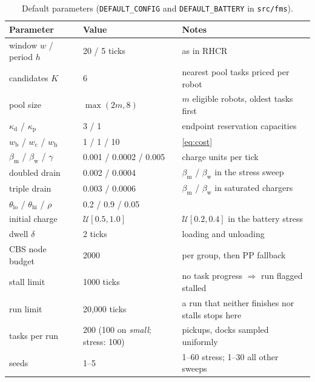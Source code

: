 \begin{table}[h]
\centering
\caption{Default parameters (\texttt{DEFAULT\_CONFIG} and \texttt{DEFAULT\_BATTERY} in \texttt{src/fms}).}
\label{tab:params}
\small
\begin{tabular}{lll}
\toprule
\textbf{Parameter} & \textbf{Value} & \textbf{Notes}\\
\midrule
window $w$ / period $h$ & 20 / 5 ticks & as in RHCR \citep{li2021rhcr}\\
candidates $K$ & 6 & nearest pool tasks priced per robot\\
pool size & $\max(2m,8)$ & $m$ eligible robots, oldest tasks first\\
$\kappa_{\mathrm{d}}$ / $\kappa_{\mathrm{p}}$ & 3 / 1 & endpoint reservation capacities\\
$w_{\mathrm{b}}$ / $w_{\mathrm{c}}$ / $w_{\mathrm{h}}$ & 1 / 1 / 10 & \cref{eq:cost}\\
$\beta_{\mathrm{m}}$ / $\beta_{\mathrm{w}}$ / $\gamma$ & 0.001 / 0.0002 / 0.005 & charge units per tick\\
doubled drain & 0.002 / 0.0004 & $\beta_{\mathrm{m}}$ / $\beta_{\mathrm{w}}$ in the stress sweep\\
triple drain & 0.003 / 0.0006 & $\beta_{\mathrm{m}}$ / $\beta_{\mathrm{w}}$ in saturated chargers\\
$\theta_{\mathrm{lo}}$ / $\theta_{\mathrm{hi}}$ / $\rho$ & 0.2 / 0.9 / 0.05 & \\
initial charge & $\mathcal{U}[0.5,1.0]$ & $\mathcal{U}[0.2,0.4]$ in the battery stress\\
dwell $\delta$ & 2 ticks & loading and unloading\\
CBS node budget & 2000 & per group, then PP fallback\\
stall limit & 1000 ticks & no task progress $\Rightarrow$ run flagged stalled\\
run limit & 20{,}000 ticks & a run that neither finishes nor stalls stops here\\
tasks per run & 200 (100 on \emph{small}; stress: 100) & pickups, docks sampled uniformly\\
seeds & 1--5 & 1--60 stress; 1--30 all other sweeps\\
\bottomrule
\end{tabular}
\end{table}

